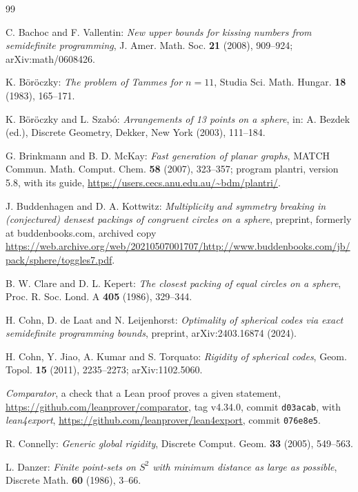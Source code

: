 \documentclass[12pt]{amsart}
\theoremstyle{definition}
\theoremstyle{plain}
\theoremstyle{definition}
\begin{document}
\begin{thebibliography}{99}

 C. Bachoc and F. Vallentin: \emph{New upper bounds for kissing numbers from semidefinite programming}, J. Amer. Math. Soc. \textbf{21} (2008), 909--924; arXiv:math/0608426.

 K. B\"or\"oczky: \emph{The problem of Tammes for $n=11$}, Studia Sci. Math. Hungar. \textbf{18} (1983), 165--171.

 K. B\"or\"oczky and L. Szab\'o: \emph{Arrangements of 13 points on a sphere}, in: A. Bezdek (ed.), Discrete Geometry, Dekker, New York (2003), 111--184.

 G. Brinkmann and B. D. McKay: \emph{Fast generation of planar graphs}, MATCH Commun. Math. Comput. Chem. \textbf{58} (2007), 323--357; program plantri, version 5.8, with its guide, \url{https://users.cecs.anu.edu.au/~bdm/plantri/}.

 J. Buddenhagen and D. A. Kottwitz: \emph{Multiplicity and symmetry breaking in (conjectured) densest packings of congruent circles on a sphere}, preprint, formerly at buddenbooks.com, archived copy \url{https://web.archive.org/web/20210507001707/http://www.buddenbooks.com/jb/pack/sphere/toggles7.pdf}.

 B. W. Clare and D. L. Kepert: \emph{The closest packing of equal circles on a sphere}, Proc. R. Soc. Lond. A \textbf{405} (1986), 329--344.

 H. Cohn, D. de Laat and N. Leijenhorst: \emph{Optimality of spherical codes via exact semidefinite programming bounds}, preprint, arXiv:2403.16874 (2024).

 H. Cohn, Y. Jiao, A. Kumar and S. Torquato: \emph{Rigidity of spherical codes}, Geom. Topol. \textbf{15} (2011), 2235--2273; arXiv:1102.5060.

 \emph{Comparator}, a check that a Lean proof proves a given statement, \url{https://github.com/leanprover/comparator}, tag v4.34.0, commit \texttt{d03acab}, with \emph{lean4export}, \url{https://github.com/leanprover/lean4export}, commit \texttt{076e8e5}.

 R. Connelly: \emph{Generic global rigidity}, Discrete Comput. Geom. \textbf{33} (2005), 549--563.

 L. Danzer: \emph{Finite point-sets on $S^2$ with minimum distance as large as possible}, Discrete Math. \textbf{60} (1986), 3--66.


\end{thebibliography}
\end{document}
